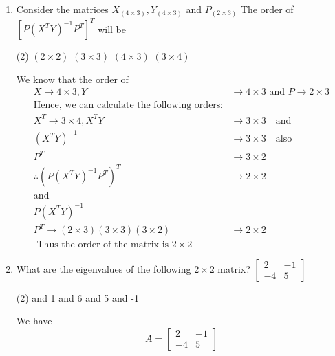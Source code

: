 \begin{enumerate}[label=\color{ocre}\textbf{\arabic*.}]
	\item Consider the matrices $X_{(4 \times 3)}, Y_{(4 \times 3)}$ and $P_{(2 \times 3)}$ The order of $\left[P\left(X^{T} Y\right)^{-1} P^{T}\right]^{T}$ will be
	
	\begin{tasks}(2)
		\task[\textbf{a.}] $(2 \times 2)$  
		\task[\textbf{b.}]$(3 \times 3)$
		\task[\textbf{c.}]$(4 \times 3)$ 
		\task[\textbf{d.}]$(3 \times 4)$ 
	\end{tasks}
	
	\begin{answer}
	We know that the order of
	\begin{align*}
	X \rightarrow 4 \times 3, Y &\rightarrow 4 \times 3 \text { and } P \rightarrow 2 \times 3\\
	\text{Hence, we can calculate the following orders:}\\
	X^{T} \rightarrow 3 \times 4, X^{T} Y &\rightarrow 3 \times 3 \quad\text{and}
	\\
	\left(X^{T} Y\right)^{-1} &\rightarrow 3 \times 3 \quad\text{also}\\
	P^{T} &\rightarrow 3 \times 2\\\therefore \left(P\left(X^{T} Y\right)^{-1} P^{T}\right)^{T} &\rightarrow 2 \times 2\\
	\text{and}\\P\left(X^{T} Y\right)^{-1}\\
	P^{T} \rightarrow(2 \times 3)(3 \times 3)(3 \times 2) &\rightarrow 2 \times 2\\
	\text{ Thus the order of the matrix is $2 \times 2$}
	\end{align*}
\end{answer}
\item What are the eigenvalues of the following $2 \times 2$ matrix?
$
\left[\begin{array}{rr}
2 & -1 \\
-4 & 5
\end{array}\right]
$
\begin{tasks}(2)
	 and 1  
	 and 6
	 and 5 
	 and -1 
\end{tasks}	
\begin{answer}
	We have
	$$
	A=\left[\begin{array}{rr}
	2 & -1 \\
	-4 & 5
	\end{array}\right]
$$
\end{answer}
\end{enumerate}
